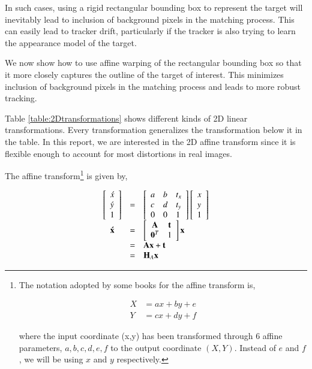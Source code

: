 In such cases, using a rigid rectangular bounding box to represent the target will inevitably lead to inclusion of background pixels in the matching process.  This can easily lead to tracker drift, particularly if the tracker is also trying to learn the appearance model of the target.

We now show how to use affine warping of the rectangular bounding box so that it more closely captures the outline of the target of interest.  This minimizes inclusion of background pixels in the matching process and leads to more robust tracking.

Table \ref{table:2Dtransformations} shows different kinds of 2D linear transformations.  Every transformation generalizes the transformation below it in the table.  In this report, we are interested in the 2D affine transform since it is flexible enough to account for most distortions in real images.

The affine transform\footnote{The notation adopted by some books for the affine transform is,

\begin{equation}
\begin{array}{llllllll}
X &= ax + by + e\\
Y &= cx + dy + f
\end{array}
\label{Eq:AffineDecomposition}
\end{equation}

where the input coordinate (x,y) has been transformed through 6 affine parameters, $a, b, c, d, e, f$ to the output coordinate $(X,Y)$.  Instead of $e$ and $f$, we will be using $x$ and $y$ respectively.}
 is given by,

\begin{equation}
\begin{array}{cllll}
\left[\begin{array}{l}\acute{x}\\\acute{y}\\1\end{array}\right]   &=& \left[ \begin{array}{lll} a &b & t_x \\ c & d & t_y \\ 0 & 0 & 1 \\ \end{array} \right] \left[\begin{array}{l}x\\y\\1\end{array}\right]\\
\mathbf{\acute{x}} &=& \left[\begin{array}{cccc}\mathbf{A} & \mathbf{t}\\\mathbf{0}^T & 1\end{array}\right] \mathbf{x}\\
&=& \mathbf{A}\mathbf{x} + \mathbf{t}\\
&=& \mathbf{H}_A \mathbf{x}\\
\end{array}
\label{Eqn:top_level}
\end{equation}

